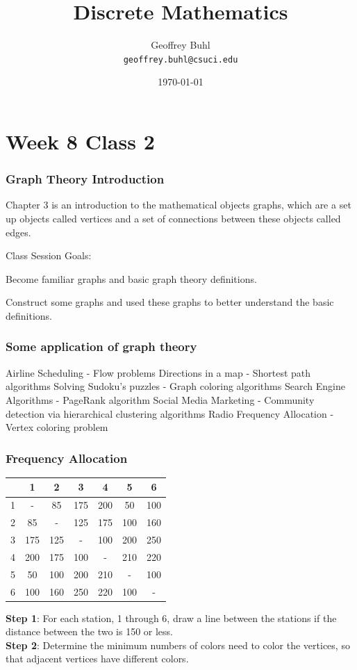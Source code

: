 \documentclass{beamer}
\title{Discrete Mathematics}
\author[Geoffrey Buhl]{Geoffrey Buhl \\ \texttt{geoffrey.buhl@csuci.edu}}
\institute[CSUCI]{California State University Channel Islands}
\date{\today}
\newenvironment{packed_enum}{
\begin{enumerate}
  \setlength{\itemsep}{1pt}
  \setlength{\parskip}{0pt}
  \setlength{\parsep}{0pt}
}{\end{enumerate}}
\begin{document}


\section{Week 8 Class 2}


\frame
{
  \frametitle{Graph Theory Introduction}

Chapter 3 is an introduction to the mathematical objects graphs, which are a set up objects called vertices and a set of connections between these objects called edges.

\vfill
Class Session Goals:
\begin{packed_enum}
\item Become familiar graphs and basic graph theory definitions.
\item Construct some graphs and used these graphs to better understand the basic definitions.
\end{packed_enum}
\vfill
}




\frame
{
  \frametitle{Some application of graph theory}

Airline Scheduling - Flow problems \vfill
Directions in a map - Shortest path algorithms\vfill
Solving Sudoku's puzzles - Graph coloring algorithms\vfill
Search Engine Algorithms - PageRank algorithm\vfill
Social Media Marketing - Community detection via hierarchical clustering algorithms \vfill
Radio Frequency Allocation - Vertex coloring problem \vfill
}

\frame
{
  \frametitle{Frequency Allocation}

\begin{center}
 \begin{tabular}{c|c|c|c|c|c|c} 
 \hline
  & 1	 & 2 & 3 & 4 & 5 & 6 \\
 \hline
 1 & - & 85 & 175 &200 & 50 & 100 \\ 
 \hline
 2 &  85 & - & 125 & 175 & 100 & 160 \\ 
 \hline
 3 & 175 & 125 & - &100 & 200 & 250 \\ 
 \hline
 4 & 200 & 175 & 100 & - & 210 & 220 \\ 
 \hline
 5 &  50 & 100 & 200 & 210 & - & 100 \\  
 \hline
  6&  100 & 160 & 250 & 220 & 100 & - \\ 
 \hline
\end{tabular}
\end{center}

{\bf Step 1}:  For each station, 1 through 6, draw a line between the stations if the distance between the two is 150 or less.\\
{\bf Step 2}:  Determine the minimum numbers of colors need to color the vertices, so that adjacent vertices have different colors.

}
\end{document}
